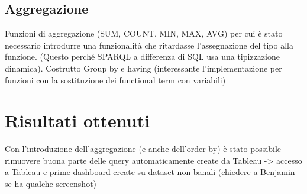 \subsection{Aggregazione}
Funzioni di aggregazione (SUM, COUNT, MIN, MAX, AVG) per cui è stato necessario introdurre una funzionalità che ritardasse l'assegnazione del 
tipo alla funzione. (Questo perché SPARQL a differenza di SQL usa una tipizzazione dinamica).
Costrutto Group by e having (interessante l'implementazione per funzioni con la sostituzione dei functional term con variabili)

\section{Risultati ottenuti}
Con l'introduzione dell'aggregazione (e anche dell'order by) è stato possibile rimuovere buona parte delle query automaticamente create da Tableau -> accesso a Tableau 
e prime dashboard create su dataset non banali (chiedere a Benjamin se ha qualche screenshot)
